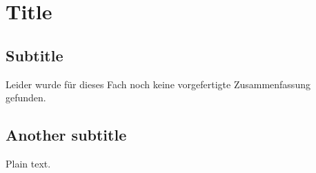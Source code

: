 \documentclass{article}
\begin{document}
\section{Title}

\subsection{Subtitle}

Leider wurde für dieses Fach noch keine vorgefertigte Zusammenfassung gefunden.

\subsection{Another subtitle}

Plain text.
\end{document}
